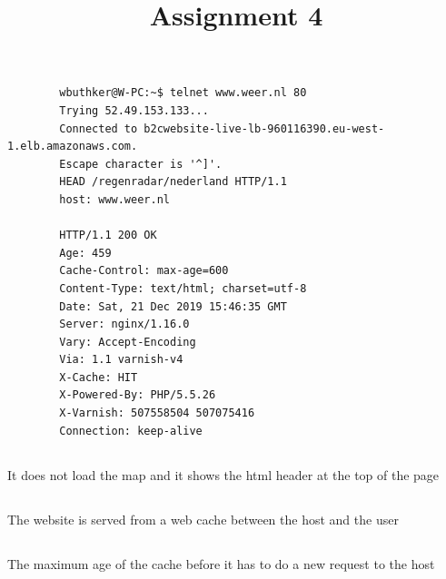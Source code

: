 \documentclass{article}
\title{Assignment 4}
\begin{document}
    \maketitle
    \section{}
    \subsection{}
    \begin{verbatim}
        wbuthker@W-PC:~$ telnet www.weer.nl 80
        Trying 52.49.153.133...
        Connected to b2cwebsite-live-lb-960116390.eu-west-1.elb.amazonaws.com.
        Escape character is '^]'.
        HEAD /regenradar/nederland HTTP/1.1
        host: www.weer.nl

        HTTP/1.1 200 OK
        Age: 459
        Cache-Control: max-age=600
        Content-Type: text/html; charset=utf-8
        Date: Sat, 21 Dec 2019 15:46:35 GMT
        Server: nginx/1.16.0
        Vary: Accept-Encoding
        Via: 1.1 varnish-v4
        X-Cache: HIT
        X-Powered-By: PHP/5.5.26
        X-Varnish: 507558504 507075416
        Connection: keep-alive

     \end{verbatim}

     \subsection{}
     It does not load the map and it shows the html header at the top of the page

     \subsection{}
     The website is served from a web cache between the host and the user

     \subsection{}
     The maximum age of the cache before it has to do a new request to the host

     \section{}
     \subsection{}
\end{document}
